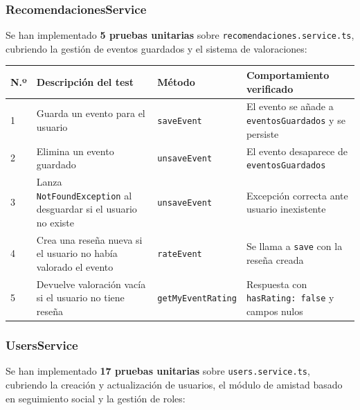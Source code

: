 \subsubsection{RecomendacionesService}

Se han implementado \textbf{5 pruebas unitarias} sobre \texttt{recomendaciones.service.ts}, cubriendo la gestión de eventos guardados y el sistema de valoraciones:

\begin{longtable}{|p{0.5cm}|p{5.5cm}|p{3.8cm}|p{4.5cm}|}
\hline
\textbf{N.º} & \textbf{Descripción del test} & \textbf{Método} & \textbf{Comportamiento verificado} \\
\hline
1 & Guarda un evento para el usuario & \texttt{saveEvent} & El evento se añade a \texttt{eventosGuardados} y se persiste \\
\hline
2 & Elimina un evento guardado & \texttt{unsaveEvent} & El evento desaparece de \texttt{eventosGuardados} \\
\hline
3 & Lanza \texttt{NotFoundException} al desguardar si el usuario no existe & \texttt{unsaveEvent} & Excepción correcta ante usuario inexistente \\
\hline
4 & Crea una reseña nueva si el usuario no había valorado el evento & \texttt{rateEvent} & Se llama a \texttt{save} con la reseña creada \\
\hline
5 & Devuelve valoración vacía si el usuario no tiene reseña & \texttt{getMyEventRating} & Respuesta con \texttt{hasRating: false} y campos nulos \\
\hline
\end{longtable}

\subsubsection{UsersService}

Se han implementado \textbf{17 pruebas unitarias} sobre \texttt{users.service.ts}, cubriendo la creación y actualización de usuarios, el módulo de amistad basado en seguimiento social y la gestión de roles:

